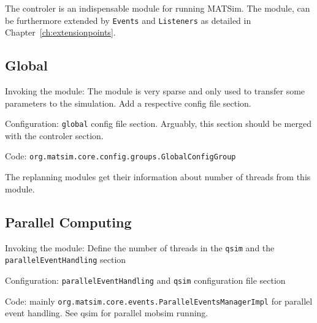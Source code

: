 The controler is an indispensable module for running MATSim. The module, can be furthermore extended by \lstinline|Events| and \lstinline|Listeners| as detailed in Chapter~\ref{ch:extensionpoints}. 
%


\subsection{Global}
\label{sec:global}
\begin{compactitem}
\item Invoking the module: The module is very sparse and only used to transfer some parameters to the simulation. Add a respective config file section.
\item Configuration: \lstinline|global| config file section. Arguably, this section should be merged with the controler section.
\item Code: \lstinline|org.matsim.core.config.groups.GlobalConfigGroup|
\end{compactitem}

The replanning modules get their information about number of threads from this module. 



\subsection{Parallel Computing}
\label{sec:parallelcomputing}
\begin{compactitem}
\item Invoking the module: Define the number of threads in the \lstinline|qsim| and the \lstinline|parallelEventHandling| section
\item Configuration: \lstinline|parallelEventHandling| and \lstinline|qsim| configuration file section
\item Code: mainly \lstinline|org.matsim.core.events.ParallelEventsManagerImpl| for parallel event handling. See qsim for parallel mobsim running.
\end{compactitem}


